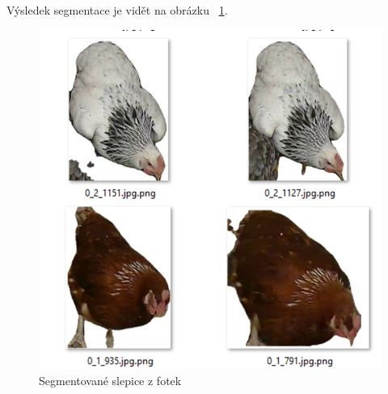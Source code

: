 Výsledek segmentace je vidět na obrázku ~\ref{fig:segmented_chicks}.

\begin{figure}[h]
    \centering
    \includegraphics[width=\textwidth]{img/segmented_chicks}
    \caption{Segmentované slepice z fotek}
    \label{fig:segmented_chicks}
\end{figure}

